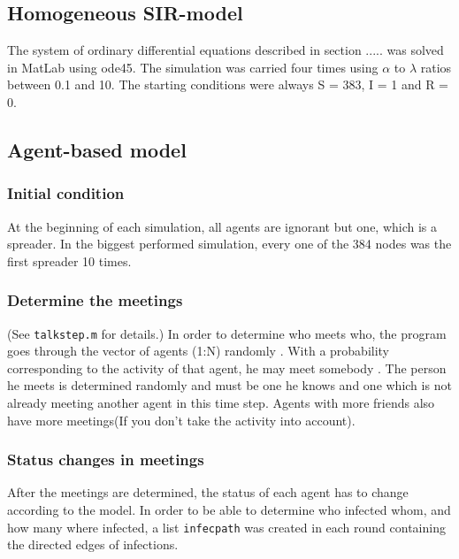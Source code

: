 \subsection{Homogeneous SIR-model}

The system of ordinary differential equations described in section ..... was solved in MatLab using ode45. The simulation was carried four times using $\alpha$ to $\lambda$ ratios between 0.1 and 10. The starting conditions were always S = 383, I = 1 and R = 0.

\subsection{Agent-based model}

\subsubsection{Initial condition}

At the beginning of each simulation, all agents are ignorant but one, which is a spreader. In the biggest performed simulation, every one of the 384 nodes was the first spreader 10 times. 

\subsubsection{Determine the meetings}

(See \texttt{talkstep.m} for details.)
\newline
\newline
In order to determine who meets who, the program goes through the vector of agents (1:N) randomly . With a probability corresponding to the activity of that agent, he may meet somebody . The person he meets is determined randomly and must be one he knows and one which is not already meeting another agent in this time step. Agents with more friends also have more meetings(If you don't take the activity into account). 

\subsubsection{Status changes in meetings}

After the meetings are determined, the status of each agent has to change according to the model. In order to be able to determine who infected whom, and how many where infected, a list \texttt{infecpath} was created in each round containing the directed edges of infections.

